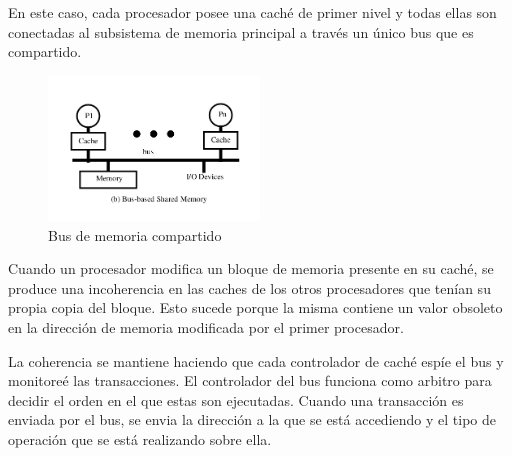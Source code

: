 En este caso, cada procesador posee una caché de primer nivel y todas ellas son conectadas al subsistema de memoria principal a través un único bus que es compartido. 

\begin{figure}[ht]
	\centering
	\includegraphics[width=0.5\textwidth]{imagenes/multiprocesor-caches}
	\caption{Bus de memoria compartido}
	\label{fig:busCompartido}
\end{figure}

Cuando un procesador modifica un bloque de memoria presente en su caché, se produce una incoherencia en las caches de los otros procesadores que tenían su propia copia del bloque. Esto sucede porque la misma contiene un valor obsoleto en la dirección de memoria modificada por el primer procesador.

%

La coherencia se mantiene haciendo que cada controlador de caché espíe el bus y monitoreé las transacciones. El controlador del bus funciona como arbitro para  decidir el orden en el que estas son ejecutadas. Cuando una transacción es enviada por el bus, se envia la dirección a la que se está accediendo y el tipo de operación que se está realizando sobre ella.

